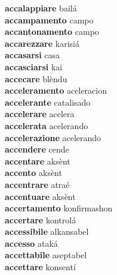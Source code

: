 \textbf{accalappiare } bailá \\
\textbf{accampamento } campo \\
\textbf{accantonamento } campo \\
\textbf{accarezzare } karisiá \\
\textbf{accasarsi } casa \\
\textbf{accasciarsi } kai \\
\textbf{accecare } blèndu \\
\textbf{acceleramento } aceleracion \\
\textbf{accelerante } catalisado \\
\textbf{accelerare } acelera \\
\textbf{accelerata } acelerando \\
\textbf{accelerazione } acelerando \\
\textbf{accendere } cende \\
\textbf{accentare } aksènt \\
\textbf{accento } aksènt \\
\textbf{accentrare } atraé \\
\textbf{accentuare } aksènt \\
\textbf{accertamento } konfirmashon \\
\textbf{accertare } kontrolá \\
\textbf{accessibile } alkansabel \\
\textbf{accesso } ataká \\
\textbf{accettabile } aseptabel \\
\textbf{accettare } konsentí \\
